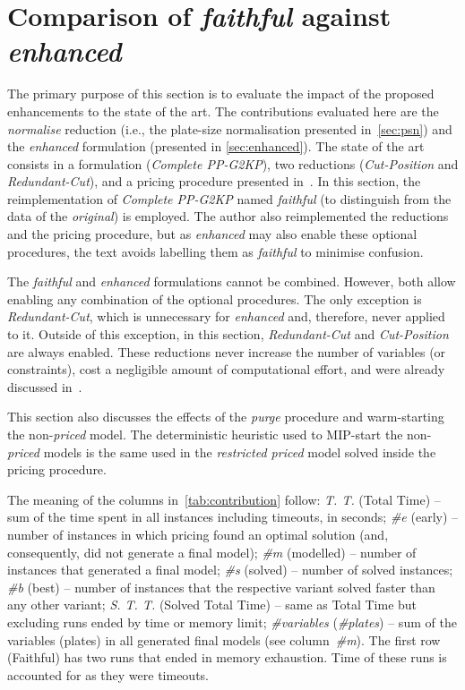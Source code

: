 \documentclass[ppgc,tese,english,formais,babel]{iiufrgs}
\begin{document}
\section{Comparison of \emph{faithful} against \emph{enhanced}}
\label{sec:comparison}

The primary purpose of this section is to evaluate the impact of the proposed enhancements to the state of the art.
The contributions evaluated here are the \emph{normalise} reduction (i.e., the plate-size normalisation presented in~\cref{sec:psn}) and the \emph{enhanced} formulation (presented in \cref{sec:enhanced}).
The state of the art consists in a formulation (\emph{Complete PP-G2KP}), two reductions (\emph{Cut-Position} and \emph{Redundant-Cut}), and a pricing procedure presented in~\citet{furini:2016,dimitri_thesis}.
In this section, the reimplementation of \emph{Complete PP-G2KP} named \emph{faithful} (to distinguish from the data of the \emph{original}) is employed.
The author also reimplemented the reductions and the pricing procedure, but as \emph{enhanced} may also enable these optional procedures, the text avoids labelling them as \emph{faithful} to minimise confusion.

The \emph{faithful} and \emph{enhanced} formulations cannot be combined.
However, both allow enabling any combination of the optional procedures.
The only exception is \emph{Redundant-Cut}, which is unnecessary for \emph{enhanced} and, therefore, never applied to it.
Outside of this exception, in this section, \emph{Redundant-Cut} and \emph{Cut-Position} are always enabled.
These reductions never increase the number of variables (or constraints), cost a negligible amount of computational effort, and were already discussed in~\citet{furini:2016,dimitri_thesis}.

This section also discusses the effects of the \emph{purge} procedure and warm-starting the non-\emph{priced} model.
The deterministic heuristic used to MIP-start the non-\emph{priced} models is the same used in the \emph{restricted priced} model solved inside the pricing procedure.

The meaning of the columns in~\cref{tab:contribution} follow:
\emph{T. T.} (Total Time) -- sum of the time spent in all instances including timeouts, in seconds;
\emph{\#e} (early) -- number of instances in which pricing found an optimal solution (and, consequently, did not generate a final model);
\emph{\#m} (modelled) -- number of instances that generated a final model;
\emph{\#s} (solved) -- number of solved instances;
\emph{\#b} (best) -- number of instances that the respective variant solved faster than any other variant;
\emph{S. T. T.} (Solved Total Time) -- same as Total Time but excluding runs ended by time or memory limit;
\emph{\#variables} (\emph{\#plates}) -- sum of the variables (plates) in all generated final models (see column~\emph{\#m}).
The first row (Faithful) has two runs that ended in memory exhaustion.
Time of these runs is accounted for as they were timeouts.
\end{document}
